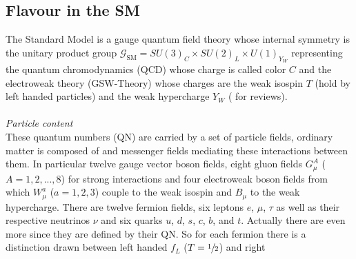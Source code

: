 \subsection{Flavour in the SM}
The Standard Model is a gauge quantum field theory whose internal symmetry is the unitary product group $\mathcal{G}_\text{SM}=SU(3)_C\times SU(2)_L\times U(1)_{Y_W}$ representing
the quantum chromodynamics (QCD) whose charge is called color $C$ and the electroweak theory (GSW-Theory) whose charges are the weak isospin $T$ 
(hold by left handed particles) and the weak hypercharge $Y_W$ (\cite{Peskin}\cite{MDSchwartz}\cite{Langacker} for reviews). 
\\ \\ \textit{Particle content}\\
\noindent These quantum numbers (QN) are carried by a set of particle fields, ordinary matter is composed
of and messenger fields mediating these interactions between them. In particular twelve gauge vector boson fields, eight gluon fields $G^A_\mu$ ($A=1,2,...,8$)
for strong 
interactions and four electroweak boson fields from which $W^a_\mu$ ($a=1,2,3$) couple to the weak isospin and $B_\mu$ to the weak hypercharge. There are twelve
fermion fields, six leptons $e$, $\mu$, $\tau$ as well as their respective neutrinos $\nu$ and six quarks $u$, $d$, $s$, $c$, $b$, and $t$. Actually there
are even more since they are defined by their QN. So for each fermion there is a distinction drawn between left handed $f_L$ ($T=\sfrac12$) and right 
